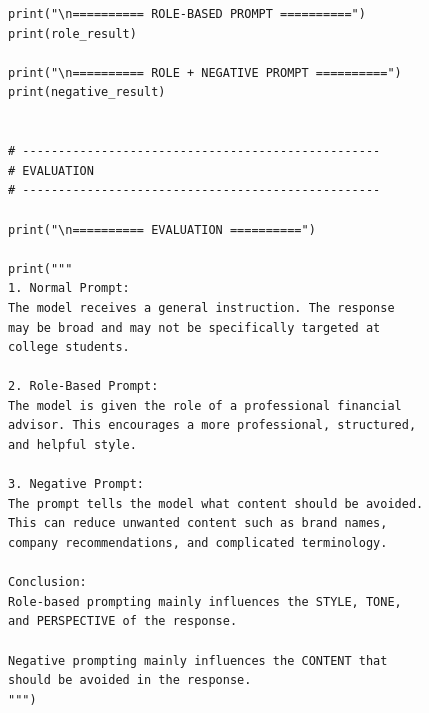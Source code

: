 \documentclass[10pt,a4paper]{article}
\begin{document}
\begin{lstlisting}[style=code]
print("\n========== ROLE-BASED PROMPT ==========")
print(role_result)

print("\n========== ROLE + NEGATIVE PROMPT ==========")
print(negative_result)


# --------------------------------------------------
# EVALUATION
# --------------------------------------------------

print("\n========== EVALUATION ==========")

print("""
1. Normal Prompt:
The model receives a general instruction. The response
may be broad and may not be specifically targeted at
college students.

2. Role-Based Prompt:
The model is given the role of a professional financial
advisor. This encourages a more professional, structured,
and helpful style.

3. Negative Prompt:
The prompt tells the model what content should be avoided.
This can reduce unwanted content such as brand names,
company recommendations, and complicated terminology.

Conclusion:
Role-based prompting mainly influences the STYLE, TONE,
and PERSPECTIVE of the response.

Negative prompting mainly influences the CONTENT that
should be avoided in the response.
""")
\end{lstlisting}
\end{document}
